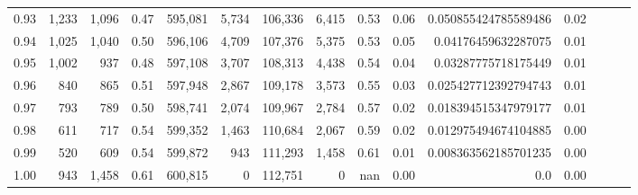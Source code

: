 \begin{tabular}{rrrrrrrrrrrrrrr}
0.93 &   1,233 &  1,096 &  0.47 &  595,081 &    5,734 &  106,336 &    6,415 &  0.53 &  0.06 &  0.050855424785589486 &      0.02 \\
0.94 &   1,025 &  1,040 &  0.50 &  596,106 &    4,709 &  107,376 &    5,375 &  0.53 &  0.05 &   0.04176459632287075 &      0.01 \\
0.95 &   1,002 &    937 &  0.48 &  597,108 &    3,707 &  108,313 &    4,438 &  0.54 &  0.04 &   0.03287775718175449 &      0.01 \\
0.96 &     840 &    865 &  0.51 &  597,948 &    2,867 &  109,178 &    3,573 &  0.55 &  0.03 &  0.025427712392794743 &      0.01 \\
0.97 &     793 &    789 &  0.50 &  598,741 &    2,074 &  109,967 &    2,784 &  0.57 &  0.02 &  0.018394515347979177 &      0.01 \\
0.98 &     611 &    717 &  0.54 &  599,352 &    1,463 &  110,684 &    2,067 &  0.59 &  0.02 &  0.012975494674104885 &      0.00 \\
0.99 &     520 &    609 &  0.54 &  599,872 &      943 &  111,293 &    1,458 &  0.61 &  0.01 &  0.008363562185701235 &      0.00 \\
1.00 &     943 &  1,458 &  0.61 &  600,815 &        0 &  112,751 &        0 &   nan &  0.00 &                   0.0 &      0.00 \\
\bottomrule
\end{tabular}
